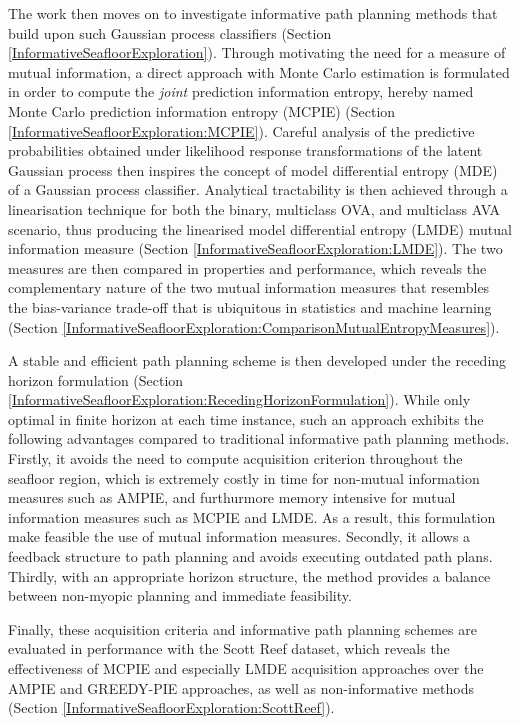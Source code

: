 	The work then moves on to investigate informative path planning methods that build upon such Gaussian process classifiers (Section \ref{InformativeSeafloorExploration}). Through motivating the need for a measure of mutual information, a direct approach with Monte Carlo estimation is formulated in order to compute the \textit{joint} prediction information entropy, hereby named Monte Carlo prediction information entropy (MCPIE) (Section \ref{InformativeSeafloorExploration:MCPIE}). Careful analysis of the predictive probabilities obtained under likelihood response transformations of the latent Gaussian process then inspires the concept of model differential entropy (MDE) of a Gaussian process classifier. Analytical tractability is then achieved through a linearisation technique for both the binary, multiclass OVA, and multiclass AVA scenario, thus producing the linearised model differential entropy (LMDE) mutual information measure (Section \ref{InformativeSeafloorExploration:LMDE}). The two measures are then compared in properties and performance, which reveals the complementary nature of the two mutual information measures that resembles the bias-variance trade-off that is ubiquitous in statistics and machine learning (Section \ref{InformativeSeafloorExploration:ComparisonMutualEntropyMeasures}).
	
	A stable and efficient path planning scheme is then developed under the receding horizon formulation (Section \ref{InformativeSeafloorExploration:RecedingHorizonFormulation}). While only optimal in finite horizon at each time instance, such an approach exhibits the following advantages compared to traditional informative path planning methods. Firstly, it avoids the need to compute acquisition criterion throughout the seafloor region, which is extremely costly in time for non-mutual information measures such as AMPIE, and furthurmore memory intensive for mutual information measures such as MCPIE and LMDE. As a result, this formulation make feasible the use of mutual information measures. Secondly, it allows a feedback structure to path planning and avoids executing outdated path plans. Thirdly, with an appropriate horizon structure, the method provides a balance between non-myopic planning and immediate feasibility.
	
	Finally, these acquisition criteria and informative path planning schemes are evaluated in performance with the Scott Reef dataset, which reveals the effectiveness of MCPIE and especially LMDE acquisition approaches over the AMPIE and GREEDY-PIE approaches, as well as non-informative methods (Section \ref{InformativeSeafloorExploration:ScottReef}).
	
